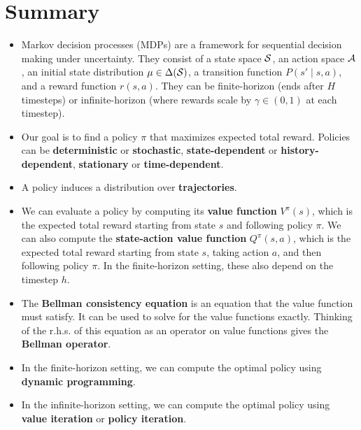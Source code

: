 \documentclass[../main/main]{subfiles}
\begin{document}
\section{Summary}

\begin{itemize}
    \item Markov decision processes (MDPs) are a framework for sequential decision making under uncertainty. They consist of a state space $\S$, an action space $\A$, an initial state distribution $\mu \in \Delta(\S)$, a transition function $P(s' \mid s, a)$, and a reward function $r(s, a)$. They can be finite-horizon (ends after $H$ timesteps) or infinite-horizon (where rewards scale by $\gamma \in (0, 1)$ at each timestep).
    \item Our goal is to find a policy $\pi$ that maximizes expected total reward. Policies can be \textbf{deterministic} or \textbf{stochastic}, \textbf{state-dependent} or \textbf{history-dependent}, \textbf{stationary} or \textbf{time-dependent}.
    \item A policy induces a distribution over \textbf{trajectories}.
    \item We can evaluate a policy by computing its \textbf{value function} $V^\pi(s)$, which is the expected total reward starting from state $s$ and following policy $\pi$. We can also compute the \textbf{state-action value function} $Q^\pi(s, a)$, which is the expected total reward starting from state $s$, taking action $a$, and then following policy $\pi$. In the finite-horizon setting, these also depend on the timestep $h$.
    \item The \textbf{Bellman consistency equation} is an equation that the value function must satisfy. It can be used to solve for the value functions exactly. Thinking of the r.h.s. of this equation as an operator on value functions gives the \textbf{Bellman operator}.
    \item In the finite-horizon setting, we can compute the optimal policy using \textbf{dynamic programming}.
    \item In the infinite-horizon setting, we can compute the optimal policy using \textbf{value iteration} or \textbf{policy iteration}.
\end{itemize}
\end{document}
